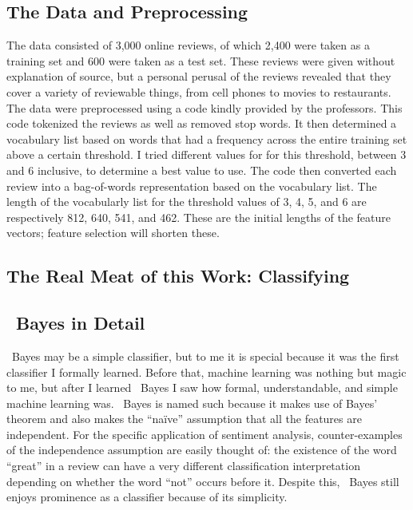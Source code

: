 \subsection{The Data and Preprocessing}
The data consisted of 3,000 online reviews, of which 2,400 were taken as a training set and 600 were taken as a test set.  These reviews were given without explanation of source, but a personal perusal of the reviews revealed that they cover a variety of reviewable things, from cell phones to movies to restaurants.  The data were preprocessed using a code kindly provided by the professors.  This code tokenized the reviews as well as removed stop words.  It then determined a vocabulary list based on words that had a frequency across the entire training set above a certain threshold.  I tried different values for for this threshold, between 3 and 6 inclusive, to determine a best value to use.  The code then converted each review into a bag-of-words representation based on the vocabulary list.  The length of the vocabularly list for the threshold values of 3, 4, 5, and 6 are respectively 812, 640, 541, and 462.  These are the initial lengths of the feature vectors; feature selection will shorten these.

\subsection{The Real Meat of this Work: Classifying}

\subsection{\Na\ Bayes in Detail}
\Na\ Bayes may be a simple classifier, but to me it is special because it was the first classifier I formally learned.  Before that, machine learning was nothing but magic to me, but after I learned \Na\ Bayes I saw how formal, understandable, and simple machine learning was.  \Na\ Bayes is named such because it makes use of Bayes' theorem and also makes the ``na\"ive'' assumption that all the features are independent.  For the specific application of sentiment analysis, counter-examples of the independence assumption are easily thought of: the existence of the word ``great'' in a review can have a very different classification interpretation depending on whether the word ``not'' occurs before it.  Despite this, \Na\ Bayes still enjoys prominence as a classifier because of its simplicity.

